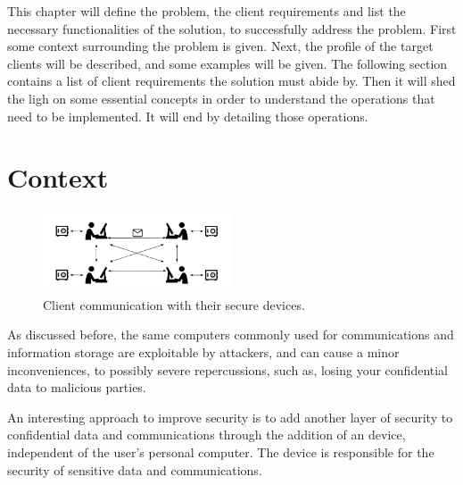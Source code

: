 \cleardoublepage
\label{chap:problem}

This chapter will define the problem, the client requirements and list the necessary functionalities of the solution, to successfully address the problem.
First some context surrounding the problem is given. 
Next, the profile of the target clients will be described, and some examples will be given.
The following section contains a list of client requirements the solution must abide by.
Then it will shed the ligh on some essential concepts in order to understand the operations that need to be implemented.
It will end by detailing those operations.

\section{Context}\label{chap:problem:context}

\begin{figure}[h]
    \centering
    \includegraphics[width=0.5\textwidth]{./Images/main-figure.png}
    \caption{Client communication with their secure devices.}
    \label{fig:main-system}
\end{figure}

As discussed before, the same computers commonly used for communications and information storage are exploitable by attackers, and can cause a minor inconveniences, to possibly severe repercussions, such as, losing your confidential data to malicious parties.

An interesting approach to improve security is to add another layer of security to confidential data and communications through the addition of an device, independent of the user's personal computer. The device is responsible for the security of sensitive data and communications.

